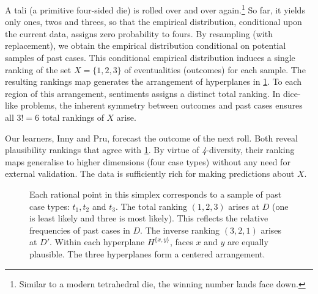 \documentclass[12pt,a4paper,twoside]{article}
\newcommand{\fourdiv}{\textit{4}-\textup{diversity}}
\begin{document}
\begin{example}[A setting where \fourdiv\ holds]\label{eg-tali}
  A tali (a primitive four-sided die) is rolled over and over
  again.\footnote{Similar to a modern tetrahedral die, the winning number lands
  face down.} So far, it yields only ones, twos and threes, so that the
  empirical distribution, conditional upon the current data, assigns zero
  probability to fours. By resampling (with replacement), we obtain the
  empirical distribution conditional on potential samples of past cases. This
  conditional empirical distribution induces a single ranking of the set
  $X=\{1, 2, 3\}$ of eventualities (outcomes) for each sample. The resulting
  rankings map generates the arrangement of hyperplanes in \cref{fig-tali}.  To
  each region of this arrangement, {sentiments} assigns a distinct
  total ranking.  
  In dice-like problems, the inherent symmetry between outcomes and past cases
  ensures all $3!=6$ total rankings of $X$ arise.

 
  Our learners, Inny and {Pru}, forecast the outcome of the next roll.  Both
  reveal plausibility rankings that agree with \cref{fig-tali}. By virtue of
  \fourdiv, their ranking maps generalise to higher dimensions (four case
  types) without any need for external validation. The data is sufficiently
  rich for making predictions about $X$.
\end{example}
\begin{figure}
  \centering 

  \caption{\label{fig-tali} Each rational point in this simplex corresponds to
  a sample of past case types: $t_1, t_2$ and $t_3$.  The total
  ranking $(1, 2, 3)$ arises at $D$ (one is least likely and three is most
  likely). This reflects the relative frequencies of past cases in $D$.  The
  inverse ranking $(3, 2, 1)$ arises at $D'$. Within each hyperplane $H^{\{x,
  y\}}$, faces $x$ and $y$ are equally plausible.  The three hyperplanes form a
  centered arrangement.}
\end{figure}
\end{document}
